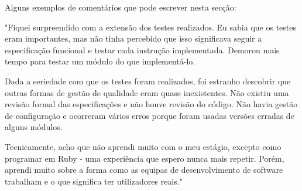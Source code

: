 \documentclass{article}
\begin{document}
Alguns exemplos de comentários que pode escrever nesta secção:

"Fiquei surpreendido com a extensão dos testes realizados. Eu sabia que os testes eram importantes, mas não tinha percebido que isso significava seguir a especificação funcional e testar cada instrução implementada. Demorou mais tempo para testar um módulo do que  implementá-lo.

Dada a seriedade com que os testes foram realizados, foi estranho descobrir que outras formas de gestão de qualidade eram quase inexistentes. Não existiu uma revisão formal das especificações e não houve revisão do código. Não havia gestão de configuração e ocorreram vários erros porque foram usadas versões erradas de alguns módulos.

Tecnicamente, acho que não aprendi muito com o meu estágio, excepto como programar em Ruby - uma experiência que espero nunca mais repetir. Porém, aprendi muito sobre a forma como as equipas de desenvolvimento de software trabalham e o que significa ter utilizadores reais."


\cleardoublepage


\label{referencias}
\end{document}
